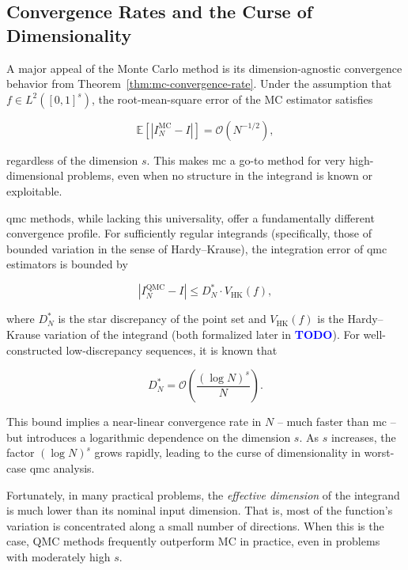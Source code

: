 \subsection{Convergence Rates and the Curse of Dimensionality}
\label{subsec:convergence-vs-dimension}

A major appeal of the Monte Carlo method is its dimension-agnostic convergence
behavior from Theorem~\ref{thm:mc-convergence-rate}. Under the assumption that
$f \in L^2([0,1]^s)$, the root-mean-square error of the MC estimator satisfies

\begin{equation}
    \mathbb{E}[ | I_N^{\mathrm{MC}} - I |] = \mathcal{O}(N^{-1/2}),
\end{equation}

regardless of the dimension $s$. This makes \ac{mc} a go-to method for very
high-dimensional problems, even when no structure in the integrand is known or
exploitable.

\ac{qmc} methods, while lacking this universality, offer a fundamentally
different convergence profile. For sufficiently regular integrands
(specifically, those of bounded variation in the sense of Hardy--Krause), the
integration error of \ac{qmc} estimators is bounded by

\begin{equation}
    | I_N^{\mathrm{QMC}} - I | \leq D_N^* \cdot V_{\mathrm{HK}}(f),
\end{equation}

where $D_N^*$ is the star discrepancy of the point set and $V_{\mathrm{HK}}(f)$
is the Hardy--Krause variation of the integrand (both formalized later in
\textcolor{blue}{\textbf{TODO}}). For well-constructed low-discrepancy
sequences, it is known that

\begin{equation}
    D_N^* = \mathcal{O}\left( \frac{(\log N)^s}{N} \right).
\end{equation}

This bound implies a near-linear convergence rate in $N$ -- much faster than
\ac{mc} -- but introduces a logarithmic dependence on the dimension $s$. As $s$
increases, the factor $(\log N)^s$ grows rapidly, leading to the curse of
dimensionality in worst-case \ac{qmc} analysis.

Fortunately, in many practical problems, the \emph{effective dimension} of the
integrand is much lower than its nominal input dimension. That is, most of the
function's variation is concentrated along a small number of directions. When
this is the case, QMC methods frequently outperform MC in practice, even in
problems with moderately high $s$.

